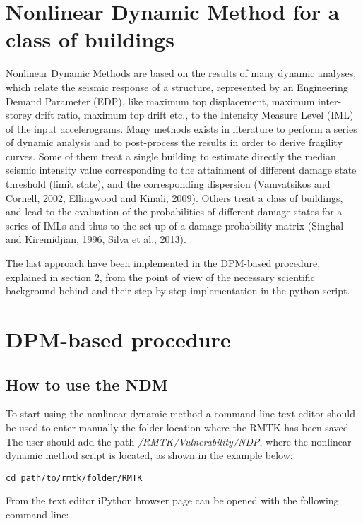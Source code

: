 \section{Nonlinear Dynamic Method for a class of buildings}
Nonlinear Dynamic Methods are based on the results of many dynamic analyses, which relate the seismic response of a structure, represented by an Engineering Demand Parameter (EDP), like maximum top displacement, maximum inter-storey drift ratio, maximum top drift etc., to the Intensity Measure Level (IML) of the input accelerograms. 
Many methods exists in literature to perform a series of dynamic analysis and to post-process the results in order to derive fragility curves. Some of them treat a single building to estimate directly the median seismic intensity value corresponding to the attainment of different damage state threshold (limit state), and the corresponding dispersion (Vamvatsikos and Cornell, 2002, Ellingwood and Kinali, 2009). Others treat a class of buildings, and lead to the evaluation of the probabilities of different damage states for a series of IMLs and thus to the set up of a damage probability matrix (Singhal and Kiremidjian, 1996, Silva et al., 2013).

The last approach have been implemented in the DPM-based procedure, explained in section \ref{sec:DPM}, from the point of view of the necessary scientific background behind and their step-by-step implementation in the python script.

\section{DPM-based procedure}
\label{sec:DPM}
\subsection{How to use the NDM}
To start using the nonlinear dynamic method a command line text editor should be used to enter manually the folder location where the RMTK has been saved. The user should add the path \textit{/RMTK/Vulnerability/NDP}, where the nonlinear dynamic method script is located, as shown in the example below:

\begin{Verbatim}[frame=single, commandchars=\\\{\}, samepage=true]
cd path/to/rmtk/folder/RMTK
\end{Verbatim}

From the text editor iPython browser page can be opened with the following command line:

